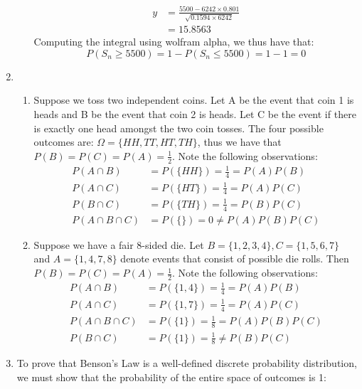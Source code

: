 \documentclass[letterpaper,12pt]{article}
\theoremstyle{definition}
\begin{document}
\begin{enumerate}
\begin{enumerate}
\begin{align*}
          y &= \frac{5500 - 6242\times 0.801}{\sqrt{0.1594\times 6242}} \\
          &= 15.8563
        \end{align*}
      Computing the integral using wolfram alpha, we thus have that:
        \begin{equation*}
          P(S_n \geq 5500) = 1 - P(S_n \leq 5500) = 1 - 1 = 0
        \end{equation*}
    \end{enumerate}
  \item
    \begin{enumerate}
      \item
        Suppose we toss two independent coins. Let A be the event that coin 1 is heads and B be the event that coin 2 is heads. Let C be the event if there is exactly one head amongst the two coin tosses. The four possible outcomes are: $\Omega = \{HH, TT, HT, TH\}$, thus we have that $P(B)=P(C)=P(A)=\frac{1}{2}$. Note the following observations:
          \begin{align*}
            P(A \cap B) & = P(\{HH\}) = \frac{1}{4} = P(A)P(B) \\
            P(A \cap C) & = P(\{HT\}) = \frac{1}{4} = P(A)P(C) \\
            P(B \cap C) & = P(\{TH\}) = \frac{1}{4} = P(B)P(C) \\
            P(A \cap B \cap C) &= P(\{\}) = 0 \neq P(A)P(B)P(C)
          \end{align*}
      \item
        Suppose we have a fair 8-sided die. Let $B = \{1, 2, 3, 4\}, C = \{1,5,6,7\}$ and $A = \{1, 4, 7, 8\}$ denote events that consist of possible die rolls. Then $P(B)=P(C)=P(A)=\frac{1}{2}$. Note the following observations:
          \begin{align*}
            P(A \cap B) & = P(\{1,4\}) = \frac{1}{4} = P(A)P(B) \\
            P(A \cap C) & = P(\{1,7\}) = \frac{1}{4} = P(A)P(C) \\
            P(A \cap B \cap C) & = P(\{1\}) = \frac{1}{8} = P(A)P(B)P(C) \\
            P(B \cap C) &= P(\{1\}) = \frac{1}{8} \neq P(B)P(C)
          \end{align*}
    \end{enumerate}
  \item
    To prove that Benson's Law is a well-defined discrete probability distribution, we must show that the probability of the entire space of outcomes is 1:

\end{enumerate}
\end{document}
